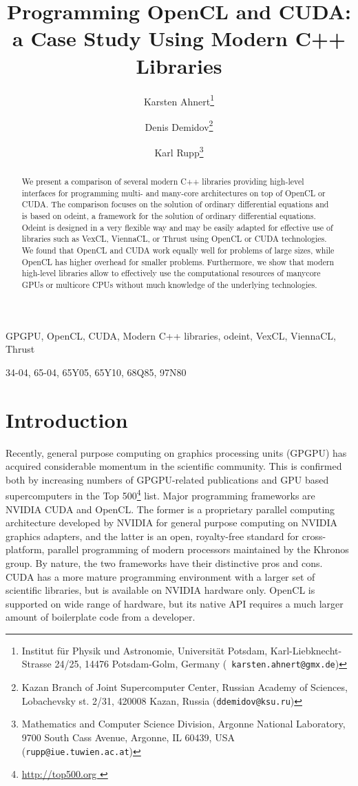 \documentclass[final]{siamltex}
\title{Programming OpenCL and CUDA:\\a Case Study Using Modern C++ Libraries}
\author{
Karsten Ahnert\thanks{Institut f\"ur Physik und Astronomie, Universit\"at Potsdam,
Karl-Liebknecht-Strasse 24/25, 14476 Potsdam-Golm, Germany ({\tt
karsten.ahnert@gmx.de}) }
\and Denis Demidov\thanks{
Kazan Branch of Joint Supercomputer Center,
Russian Academy of Sciences,
Lobachevsky st. 2/31, 420008 Kazan, Russia
({\tt ddemidov@ksu.ru}) }
\and Karl Rupp\thanks{Mathematics and Computer Science Division,
Argonne National Laboratory,
9700 South Cass Avenue, Argonne, IL 60439, USA
({\tt rupp@iue.tuwien.ac.at}) } }
\begin{document}
\maketitle

\begin{abstract}
    We present a comparison of several modern C++ libraries providing high-level interfaces
    for programming multi- and many-core architectures on top of OpenCL or CUDA.
    The comparison focuses on the solution of ordinary differential equations and is based on odeint,
    a framework for the solution of ordinary differential equations. Odeint is designed in a
    very flexible way and may be easily adapted for effective use of libraries such
    as VexCL, ViennaCL, or Thrust using OpenCL or CUDA technologies.
    We found that OpenCL and CUDA work equally well for problems
    of large sizes, while OpenCL has higher overhead for smaller problems.
    Furthermore, we show that modern high-level libraries allow to effectively
    use the computational resources of manycore GPUs or multicore CPUs without much
    knowledge of the underlying technologies.
\end{abstract}

\begin{keywords}
    GPGPU, OpenCL, CUDA, Modern C++ libraries, odeint, VexCL, ViennaCL, Thrust
\end{keywords}

\begin{AMS}
    34-04, 65-04, 65Y05, 65Y10, 68Q85, 97N80
\end{AMS}


%
%
\section{Introduction}

\pagestyle{myheadings}

\thispagestyle{plain}


Recently, general purpose computing on graphics processing units (GPGPU) has
acquired considerable momentum in the scientific community. This is confirmed
both by increasing numbers of GPGPU-related publications and GPU based
supercomputers in the Top 500\footnote{ \href{ http://top500.org }{
http://top500.org }} list. Major programming frameworks are NVIDIA CUDA and
OpenCL.  The former is a proprietary parallel computing architecture developed
by NVIDIA for general purpose computing on NVIDIA graphics adapters, and the
latter is an open, royalty-free standard for cross-platform, parallel
programming of modern processors maintained by the Khronos group. By nature,
the two frameworks have their distinctive pros and cons. CUDA has a more mature
programming environment with a larger set of scientific libraries, but is
available on NVIDIA hardware only. OpenCL is supported on wide range of hardware,
but its native API requires a much larger amount of boilerplate code from a
developer.
\end{document}
